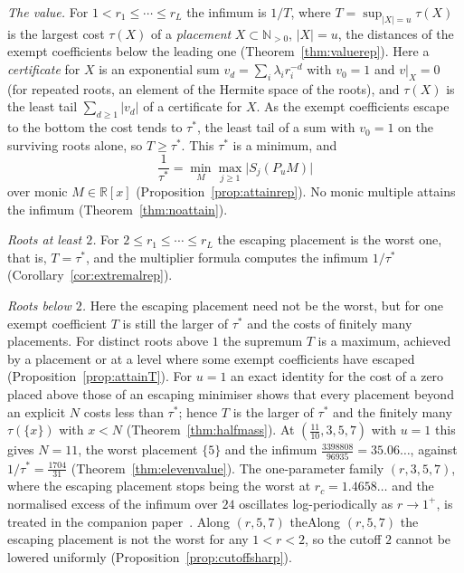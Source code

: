 \documentclass[11pt]{article}
\theoremstyle{definition}
\theoremstyle{plain}
\newcommand{\R}{\mathbb R}
\newcommand{\N}{\mathbb N}
\begin{document}
\emph{The value.}  For $1<r_1\le\cdots\le r_L$ the infimum is $1/T$, where
$T=\sup_{|X|=u}\tau(X)$ is the largest cost $\tau(X)$ of a \emph{placement}
$X\subset\N_{>0}$, $|X|=u$, the distances of the exempt coefficients below
the leading one (Theorem~\ref{thm:valuerep}).  Here a \emph{certificate} for
$X$ is an exponential sum $v_d=\sum_i\lambda_ir_i^{-d}$ with $v_0=1$ and
$v|_X=0$ (for repeated roots, an element of the Hermite space of the roots),
and $\tau(X)$ is the least tail $\sum_{d\ge1}|v_d|$ of a certificate for $X$.
As the exempt
coefficients escape to the bottom the cost tends to $\tau^*$, the least tail
of a sum with $v_0=1$ on the surviving roots alone, so $T\ge\tau^*$.  This
$\tau^*$ is a minimum, and
\[
  \frac1{\tau^*}=\min_M\max_{j\ge1}\bigl|S_j(P_uM)\bigr|
\]
over monic $M\in\R[x]$ (Proposition~\ref{prop:attainrep}).  No monic
multiple attains the infimum (Theorem~\ref{thm:noattain}).

\emph{Roots at least $2$.}  For $2\le r_1\le\cdots\le r_L$ the escaping
placement is the worst one, that is, $T=\tau^*$, and the multiplier formula
computes the infimum $1/\tau^*$ (Corollary~\ref{cor:extremalrep}).

\emph{Roots below $2$.}  Here the escaping placement need not be the worst,
but for one exempt coefficient $T$ is still the larger of $\tau^*$ and the
costs of finitely many placements.
For distinct roots above $1$ the supremum $T$ is a maximum, achieved by a
placement or at a level where some exempt coefficients have escaped
(Proposition~\ref{prop:attainT}).  For $u=1$ an exact identity for the cost
of a zero placed above those of an escaping minimiser shows that every
placement beyond an explicit $N$ costs less than $\tau^*$; hence $T$ is the
larger of $\tau^*$ and the finitely many $\tau(\{x\})$ with $x<N$
(Theorem~\ref{thm:halfmass}).  At $(\tfrac{11}{10},3,5,7)$ with $u=1$ this
gives $N=11$, the worst placement $\{5\}$ and the infimum
$\tfrac{3398808}{96935}=35.06\ldots$, against $1/\tau^*=\tfrac{1704}{31}$
(Theorem~\ref{thm:elevenvalue}).  The one-parameter family $(r,3,5,7)$, where
the escaping placement stops being the worst at $r_c=1.4658\ldots$ and the
normalised excess of the infimum over $24$ oscillates log-periodically as
$r\to1^+$, is treated in the companion paper~\cite{coefficient-mass-family}.
Along $(r,5,7)$ theAlong $(r,5,7)$ the
escaping placement is not the worst for any $1<r<2$, so the cutoff $2$
cannot be lowered uniformly (Proposition~\ref{prop:cutoffsharp}).
\end{document}

